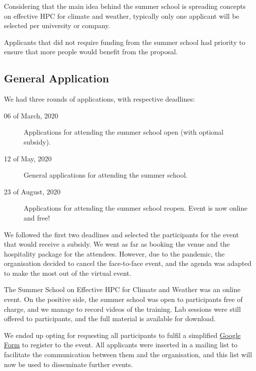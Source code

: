 Considering that the main idea behind the summer school is spreading concepts on effective HPC for climate and weather, typically only one applicant will be selected per university or company.

Applicants that did not require funding from the summer school had priority to ensure that more people would benefit from the proposal.

\subsection{General Application}

We had three rounds of applications, with respective deadlines:

\begin{description}

\item[06 of March, 2020] Applications for attending the summer school open (with optional subsidy).

\item[12 of May, 2020] General applications for attending the summer school.

\item[23 of August, 2020] Applications for attending the summer school reopen. Event is now online and free!

\end{description}

We followed the first two deadlines and selected the participants for the event that would receive a subsidy. We went as far as booking the venue and the hospitality package for the attendees. However, due to the pandemic, the organisation decided to cancel the face-to-face event, and the agenda was adapted to make the most out of the virtual event.

The Summer School on Effective HPC for Climate and Weather was an online event. On the positive side, the summer school was open to participants free of charge, and we manage to record videos of the training. Lab sessions were still offered to participants, and the full material is available for download.

We ended up opting for requesting all participants to fulfil a simplified \href{https://docs.google.com/forms/d/1jytBiXi3RMdmnzyZc08L82krIhWzetWH909enjLhm9E/}{Google Form} to register to the event. All applicants were inserted in a mailing list to facilitate the communication between them and the organisation, and this list will now be used to disseminate further events.

